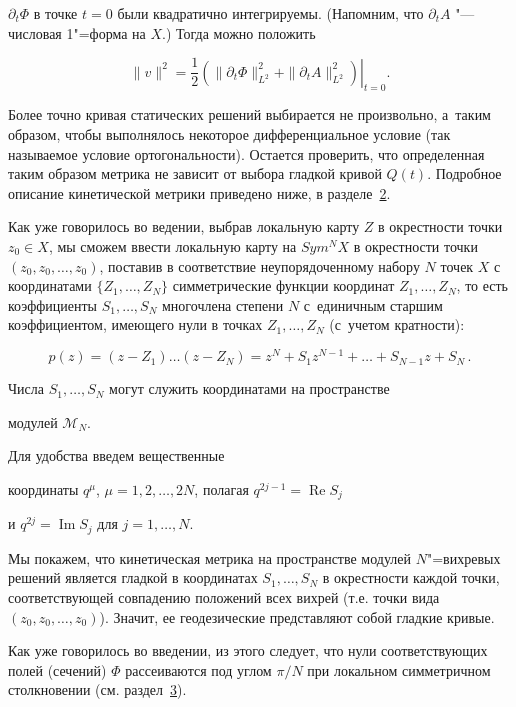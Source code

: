$\partial_t\Phi$ в точке $t=0$ были квадратично интегрируемы. (Напомним, что $\partial_tA$ "---  числовая 1"=форма на $X$.) Тогда можно положить

$$\|v\|^2=\dfrac12\left.(\|\partial_t\Phi\|^2_{L^2}+\|\partial_t A\|^2_{L^2})\right|_{t=0}.$$  



Более точно кривая статических решений выбирается не произвольно, а~таким образом, чтобы выполнялось некоторое дифференциальное условие (так называемое условие ортогональности). Остается проверить, что определенная таким образом метрика не зависит от выбора гладкой кривой $Q(t)$. Подробное описание кинетической метрики приведено ниже, в разделе~\hyperlink{kineticmetric}{2}.



Как уже говорилось во ведении,  выбрав локальную карту $Z$ в окрестности точки $z_0\in X$, мы сможем ввести локальную карту на $Sym^NX$ в окрестности точки $(z_0,z_0,\dots,z_0)$,  поставив в соответствие неупорядоченному набору $N$ точек $X$ с координатами $\{Z_1,\dots,Z_N\}$ симметрические функции координат $Z_1,\dots,Z_N$, то есть коэффициенты $S_1,\dots,S_N$ многочлена степени $N$ с~единичным старшим коэффициентом, имеющего нули в точках  $Z_1,\dots,Z_N$ (с~учетом кратности):

$$

p(z)=(z-Z_1)\dots(z-Z_N)=z^N+S_1z^{N-1}+\dots+S_{N-1}z+S_N\,.

$$

Числа $S_1,\dots,S_N$ могут служить координатами на пространстве

модулей $\mathcal M_N$. 

Для удобства введем вещественные

координаты $q^{\mu}$, $\mu=1, 2,\dots, 2N$, полагая $q^{2j-1}=\mathop{\mathrm {Re}}S_j$

и $q^{2j}=\mathop{\mathrm {Im}}S_j$ для $j=1,\dots,N$.



Мы покажем, что кинетическая метрика на пространстве модулей $N$"=вихревых решений является гладкой в координатах $S_1,\dots,S_N$ в окрестности  каждой точки, соответствующей совпадению положений всех вихрей (т.е. точки вида $(z_0,z_0,\dots,z_0)$). Значит, ее геодезические представляют собой гладкие кривые. 

Как уже говорилось во введении, из этого следует, что нули соответствующих полей (сечений) $\Phi$ рассеиваются под углом $\pi/N$ при локальном симметричном столкновении (см. раздел~\hyperlink{localscattering}{3}).

